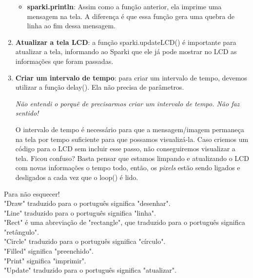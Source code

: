 \documentclass[conference]{IEEEtran}
\begin{document}
\begin{enumerate}
\begin{itemize}
                \item{\textbf{sparki.println}}: Assim como a função anterior, ela imprime uma mensagem na tela. A diferença é que essa função gera uma quebra de linha ao fim dessa mensagem.
            \end{itemize}
        \item {\textbf{Atualizar a tela LCD}}: a função { \selectfont sparki.updateLCD()} é importante para atualizar a tela, informando ao Sparki que ele já pode mostrar no LCD as informações que foram passadas.
        \item {\textbf{Criar um intervalo de tempo}}: para criar um intervalo de tempo, devemos utilizar a função { \selectfont delay()}. Ela não precisa de parâmetros.
        \par
        {\textit{Não entendi o porquê de precisarmos criar um intervalo de tempo. Não faz sentido!}}\\
        \par
        O intervalo de tempo é necessário para que a mensagem/imagem permaneça na tela por tempo suficiente para que possamos visualizá-la. Caso criemos um código para o LCD sem incluir esse passo, não conseguiremos visualizar a tela. Ficou confuso? Basta pensar que estamos limpando e atualizando o LCD com novas informações o tempo todo, então, os {\textit{pixels}} estão sendo ligados e desligados a cada vez que o {  loop()} é lido.
    \end{enumerate}
    \begin{center}
        {\color{azulbebe} Para não esquecer!}\\
        "Draw" traduzido para o português significa "desenhar".\\
        "Line" traduzido para o português significa "linha".\\
        "Rect" é uma abreviação de "rectangle", que traduzido para o português significa "retângulo".\\
        "Circle" traduzido para o português significa "círculo".\\
        "Filled" significa "preenchido".\\
        "Print" significa "imprimir".\\
        "Update" traduzido para o português significa "atualizar".
    \end{center}
\end{document}
